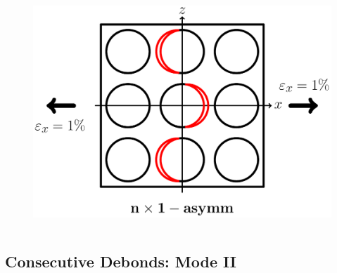 \documentclass[first,firstsupp,lastsupp,last,hyperref,table]{ETHclass}
\begin{document}
\begin{frame}
\begin{columns}
\begin{column}{0.35\textwidth}
\begin{figure}
\end{figure}
\vspace{-0.5cm}
\begin{figure}
\centering
\includegraphics[width=\columnwidth]{twofibers-oppositeside-dtheta80.pdf}
\end{figure}
\end{column}
\end{columns}
\end{frame}

\subsection{Consecutive Debonds: Mode II}
\end{document}
